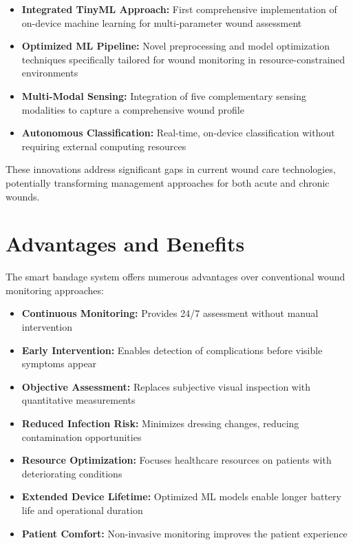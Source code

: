 \documentclass[conference]{IEEEtran}
\begin{document}
\begin{itemize}
    \item \textbf{Integrated TinyML Approach:} First comprehensive implementation of on-device machine learning for multi-parameter wound assessment
    \item \textbf{Optimized ML Pipeline:} Novel preprocessing and model optimization techniques specifically tailored for wound monitoring in resource-constrained environments
    \item \textbf{Multi-Modal Sensing:} Integration of five complementary sensing modalities to capture a comprehensive wound profile
    \item \textbf{Autonomous Classification:} Real-time, on-device classification without requiring external computing resources
\end{itemize}

These innovations address significant gaps in current wound care technologies, potentially transforming management approaches for both acute and chronic wounds.

\section{Advantages and Benefits}
The smart bandage system offers numerous advantages over conventional wound monitoring approaches:

\begin{itemize}
    \item \textbf{Continuous Monitoring:} Provides 24/7 assessment without manual intervention
    \item \textbf{Early Intervention:} Enables detection of complications before visible symptoms appear
    \item \textbf{Objective Assessment:} Replaces subjective visual inspection with quantitative measurements
    \item \textbf{Reduced Infection Risk:} Minimizes dressing changes, reducing contamination opportunities
    \item \textbf{Resource Optimization:} Focuses healthcare resources on patients with deteriorating conditions
    \item \textbf{Extended Device Lifetime:} Optimized ML models enable longer battery life and operational duration
    \item \textbf{Patient Comfort:} Non-invasive monitoring improves the patient experience
\end{itemize}
\end{document}
